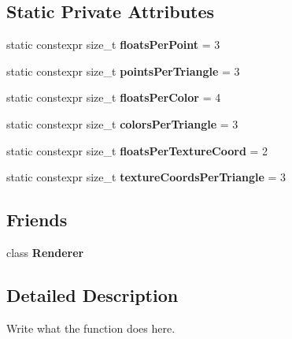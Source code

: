 \subsection*{Static Private Attributes}
\begin{DoxyCompactItemize}
\item 
\hypertarget{classMesh__t_a4f2c7b37ff15ffe73988ef207240a509}{static constexpr size\+\_\+t {\bfseries floats\+Per\+Point} = 3}\label{classMesh__t_a4f2c7b37ff15ffe73988ef207240a509}

\item 
\hypertarget{classMesh__t_a3bf64bee9bec75179cc165d29049ff0b}{static constexpr size\+\_\+t {\bfseries points\+Per\+Triangle} = 3}\label{classMesh__t_a3bf64bee9bec75179cc165d29049ff0b}

\item 
\hypertarget{classMesh__t_a7ae7a68747f222dac660b2f3dde25cf9}{static constexpr size\+\_\+t {\bfseries floats\+Per\+Color} = 4}\label{classMesh__t_a7ae7a68747f222dac660b2f3dde25cf9}

\item 
\hypertarget{classMesh__t_a00cbfa82f20e31570dfc9a1878258d57}{static constexpr size\+\_\+t {\bfseries colors\+Per\+Triangle} = 3}\label{classMesh__t_a00cbfa82f20e31570dfc9a1878258d57}

\item 
\hypertarget{classMesh__t_a4b8a3e8605f1ce517821ffb0192368e7}{static constexpr size\+\_\+t {\bfseries floats\+Per\+Texture\+Coord} = 2}\label{classMesh__t_a4b8a3e8605f1ce517821ffb0192368e7}

\item 
\hypertarget{classMesh__t_ae3104029e1f9647164ca4a9f83babecb}{static constexpr size\+\_\+t {\bfseries texture\+Coords\+Per\+Triangle} = 3}\label{classMesh__t_ae3104029e1f9647164ca4a9f83babecb}

\end{DoxyCompactItemize}
\subsection*{Friends}
\begin{DoxyCompactItemize}
\item 
\hypertarget{classMesh__t_a70538530bc36e033e360880ef311df61}{class {\bfseries Renderer}}\label{classMesh__t_a70538530bc36e033e360880ef311df61}

\end{DoxyCompactItemize}


\subsection{Detailed Description}
Write what the function does here. 

